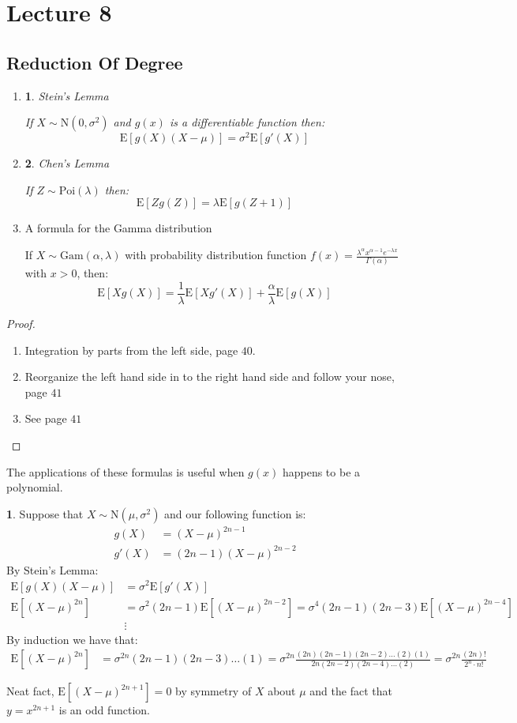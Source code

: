 \documentclass[english,12pt]{article}
\theoremstyle{plain}
\newtheorem*{lemma}{\protect\lemmaname}
\theoremstyle{definition}
\newtheorem*{example}{\protect\examplename}
\theoremstyle{definition} %
\newcommand{\lem}[1]{\begin{lemma} #1 \end{lemma} }
\newcommand{\eg}[1]{\begin{example} #1 \end{example} }
\newcommand{\prf}[1]{\begin{proof} #1 \end{proof} }
\providecommand{\lemmaname}{Lemma}
\providecommand{\examplename}{Example}
\newcommand{\enum}[1]{\begin{enumerate} #1 \end{enumerate}}
\newcommand{\ex}[1]{\mbox{E} \left[ #1 \right]}
\begin{document}
\section*{Lecture 8}
\subsection{Reduction Of Degree}

\enum{
  \item 
    \lem{
    Stein's Lemma
    
    If $X\sim \text{N}(0,\sigma^2)$ and $g(x)$ is a differentiable function then:
    \[\ex{g(X)(X-\mu)}=\sigma^2\ex{g'(X)}\]
    }
  \item
    \lem{
    Chen's Lemma
    
    If $Z\sim\text{Poi}(\lambda)$ then:
    \[\ex{Zg(Z)}=\lambda\ex{g(Z+1)}\]
    }
  \item
  
    A formula for the Gamma distribution
    
    If $X\sim \text{Gam}(\alpha,\lambda)$ with probability distribution function $f(x)=\frac{\lambda^\alpha x^{\alpha-1}e^{-\lambda x}}{\Gamma(\alpha)}$ with $x>0$, then:
    \[\ex{Xg(X)}=\frac{1}{\lambda}\ex{Xg'(X)}+\frac{\alpha}{\lambda}\ex{g(X)}\]
}

\prf{\
    \enum{
        \item Integration by parts from the left side, page $40$.
        \item Reorganize the left hand side in to the right hand side and follow your nose, page $41$
        \item See page $41$
	}
}

The applications of these formulas is useful when $g(x)$ happens to be a polynomial.
\eg{
Suppose that $X\sim\text{N}(\mu,\sigma^2)$ and our following function is:
\begin{align*}
g(X)&=(X-\mu)^{2n-1}\\
g'(X)&=(2n-1)(X-\mu)^{2n-2}
\end{align*}
By Stein's Lemma:
\begin{align*}
\ex{g(X)(X-\mu)}&=\sigma^2\ex{g'(X)}\\
\ex{(X-\mu)^{2n}}&=\sigma^2(2n-1)\ex{(X-\mu)^{2n-2}}
=\sigma^4(2n-1)(2n-3)\ex{(X-\mu)^{2n-4}}\\
&\vdots
\end{align*}
By induction we have that:
\begin{align*}
\ex{(X-\mu)^{2n}}&=\sigma^{2n}(2n-1)(2n-3)\ldots(1)
=\sigma^{2n}\frac{(2n)(2n-1)(2n-2)\ldots(2)(1)}{2n(2n-2)(2n-4)\ldots(2)}
=\sigma^{2n}\frac{(2n)!}{2^n\cdot n!}
\end{align*}

Neat fact, $\ex{(X-\mu)^{2n+1}}=0$ by symmetry of $X$ about $\mu$ and the fact that $y=x^{2n+1}$ is an odd function.
}
\end{document}
